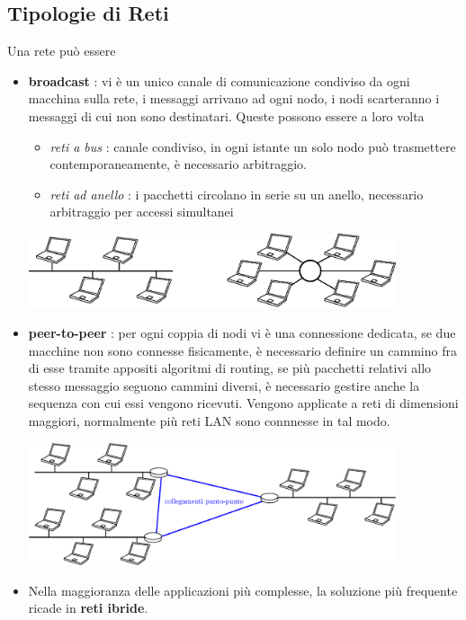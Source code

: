\documentclass[10pt, letterpaper]{report}
\begin{document}
\subsection{Tipologie di Reti}
Una rete può essere\begin{itemize}
    \item \textbf{broadcast} : vi è un unico canale di comunicazione condiviso da ogni macchina 
    sulla rete, i messaggi arrivano ad ogni nodo, i nodi scarteranno i messaggi di cui non sono 
    destinatari. Queste possono essere a loro volta\begin{itemize}
        \item \textit{reti a bus} : canale condiviso, in ogni istante un solo nodo può trasmettere 
        contemporaneamente, è necessario arbitraggio. 
        \item \textit{reti ad anello} : i pacchetti circolano in serie su un anello, necessario 
        arbitraggio per accessi simultanei
    \end{itemize}
    \begin{center}
        \includegraphics[width=0.85\textwidth ]{images/anelloEbus.eps}
    \end{center}
    \item \textbf{peer-to-peer} : per ogni coppia di nodi vi è una connessione dedicata, 
    se due macchine non sono connesse fisicamente, è necessario definire un cammino fra di esse tramite 
    appositi algoritmi di routing, 
    se più pacchetti relativi allo stesso messaggio seguono cammini diversi, è
    necessario gestire anche la sequenza con cui essi vengono ricevuti. Vengono applicate a reti di dimensioni maggiori, normalmente 
    più reti LAN sono connnesse in tal modo.\begin{center}
        \includegraphics[width=0.85\textwidth ]{images/puntopunto.eps}
    \end{center}
    \item Nella maggioranza delle applicazioni più complesse, la soluzione più frequente 
    ricade in \textbf{reti ibride}.
\end{itemize}
\end{document}
